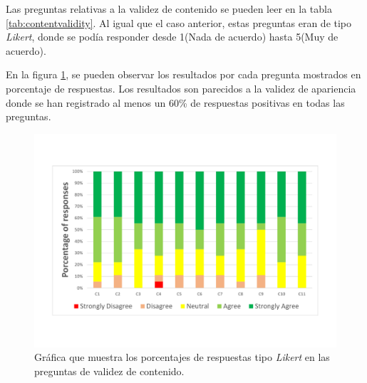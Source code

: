 Las preguntas relativas a la validez de contenido se pueden leer en la tabla \ref{tab:contentvalidity}. Al igual que el caso anterior, estas preguntas eran de tipo \emph{Likert}, donde se podía responder desde 1(Nada de acuerdo) hasta 5(Muy de acuerdo). 

En la figura \ref{fig:contentvalidity}, se pueden observar los resultados por cada pregunta mostrados en porcentaje de respuestas. Los resultados son parecidos a la validez de apariencia donde se han registrado al menos un 60\% de respuestas positivas en todas las preguntas. 

\begin{figure}[hb]
    \centering
    \includegraphics[trim={15mm 25mm 15mm 25mm},clip,width=\linewidth]{IMG/contentvalidty.pdf}
    \caption{Gráfica que muestra los porcentajes de respuestas tipo \emph{Likert} en las preguntas de validez de contenido.}
    \label{fig:contentvalidity}
\end{figure}




